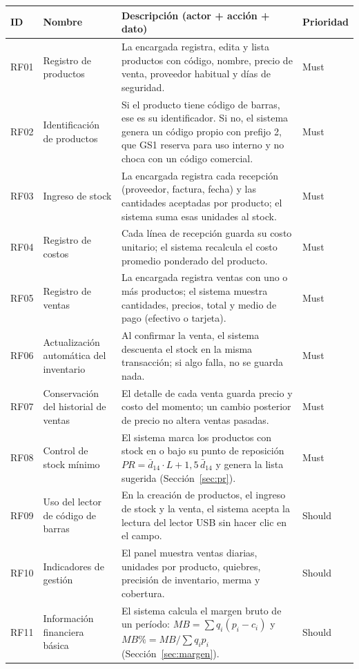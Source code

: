 \documentclass[10pt,a4paper]{article}
\begin{document}
\small
\begin{longtable}{@{}p{0.9cm}p{3.2cm}p{9.6cm}p{1.3cm}@{}}
\toprule
\textbf{ID} & \textbf{Nombre} & \textbf{Descripción (actor + acción + dato)} & \textbf{Prioridad} \\
\midrule
\endhead
RF01 & Registro de productos & La encargada registra, edita y lista productos con código, nombre, precio de venta, proveedor habitual y días de seguridad. & Must \\
RF02 & Identificación de productos & Si el producto tiene código de barras, ese es su identificador. Si no, el sistema genera un código propio con prefijo 2, que GS1 reserva para uso interno y no choca con un código comercial. & Must \\
RF03 & Ingreso de stock & La encargada registra cada recepción (proveedor, factura, fecha) y las cantidades aceptadas por producto; el sistema suma esas unidades al stock. & Must \\
RF04 & Registro de costos & Cada línea de recepción guarda su costo unitario; el sistema recalcula el costo promedio ponderado del producto. & Must \\
RF05 & Registro de ventas & La encargada registra ventas con uno o más productos; el sistema muestra cantidades, precios, total y medio de pago (efectivo o tarjeta). & Must \\
RF06 & Actualización automática del inventario & Al confirmar la venta, el sistema descuenta el stock en la misma transacción; si algo falla, no se guarda nada. & Must \\
RF07 & Conservación del historial de ventas & El detalle de cada venta guarda precio y costo del momento; un cambio posterior de precio no altera ventas pasadas. & Must \\
RF08 & Control de stock mínimo & El sistema marca los productos con stock en o bajo su punto de reposición $PR = \bar d_{14}\cdot L + 1{,}5\,\bar d_{14}$ y genera la lista sugerida (Sección~\ref{sec:pr}). & Must \\
RF09 & Uso del lector de código de barras & En la creación de productos, el ingreso de stock y la venta, el sistema acepta la lectura del lector USB sin hacer clic en el campo. & Should \\
RF10 & Indicadores de gestión & El panel muestra ventas diarias, unidades por producto, quiebres, precisión de inventario, merma y cobertura. & Should \\
RF11 & Información financiera básica & El sistema calcula el margen bruto de un período: $MB=\sum q_i(p_i-c_i)$ y $MB\%=MB/\sum q_i p_i$ (Sección~\ref{sec:margen}). & Should \\

\end{longtable}
\end{document}
